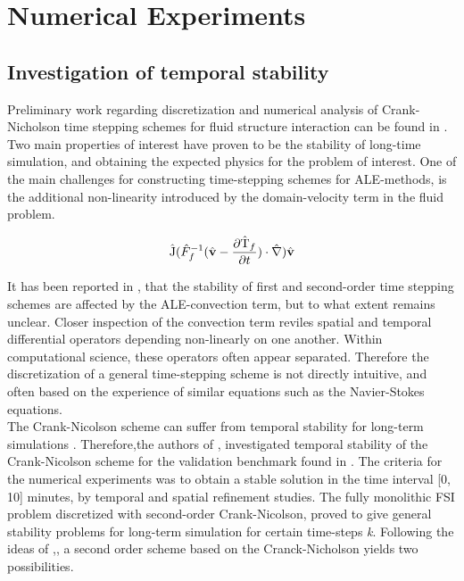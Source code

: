  \chapter{Numerical Experiments}

\section{Investigation of temporal stability}

Preliminary work regarding discretization and numerical analysis of Crank-Nicholson time stepping schemes for fluid structure interaction can be found in \cite{Wickb}. Two main properties of interest 
 have proven to be the stability of long-time simulation, and obtaining the expected physics for the problem of interest. One of the main challenges for constructing time-stepping schemes for ALE-methods, is the additional non-linearity introduced by the domain-velocity term in the fluid problem. 

\begin{align}
\text{\^{J}} (\hat{F}_f^{-1}(\hat{\mathbf{v}} - \frac{\partial \text{\^{T}}_f}{\partial t}) \cdot \hat{\nabla}) \hat{\mathbf{v}}
\end{align} 

It has been reported in \cite{Formaggia2004, Formaggia1991}, that the stability of first and second-order time stepping schemes are affected by the ALE-convection term, but to what extent remains unclear.
Closer inspection of the convection term reviles spatial and temporal differential operators depending non-linearly on one another. Within computational science, these operators often appear separated. Therefore the discretization of a general time-stepping scheme is not directly intuitive, and often based on the experience of similar equations such as the Navier-Stokes equations. \\

The Crank-Nicolson scheme can suffer from temporal stability for long-term simulations \cite{Wick2013a}. Therefore,the authors of \cite{Richter2015}, investigated temporal stability of the Crank-Nicolson scheme for the validation benchmark found in \cite{Hron2006}.  
The criteria for the numerical experiments was to obtain a stable solution in the time interval [0, 10] minutes, by temporal and spatial refinement studies. The fully monolithic FSI problem discretized with second-order Crank-Nicolson, proved to give general stability problems for long-term simulation for certain time-steps \textit{k}.  Following the ideas of \cite{Richter2015},, a second order scheme based on the Cranck-Nicholson yields two possibilities.

